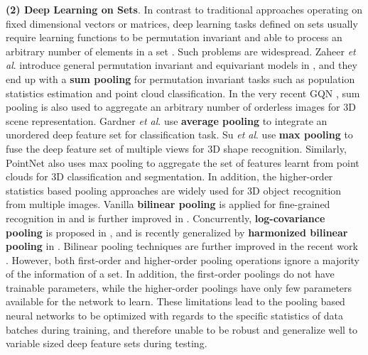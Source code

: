 \documentclass[twocolumn]{svjour3}    \pdfoutput=1
\newcommand{\etal}{\textit{et al}. }
\begin{document}
\noindent \textbf{(2) Deep Learning on Sets}. In contrast to traditional approaches operating on fixed dimensional vectors or matrices, deep learning tasks defined on sets usually require learning functions to be permutation invariant and able to process an arbitrary number of elements in a set \citep{Zaheer2017}. Such problems are widespread. Zaheer \etal introduce general permutation invariant and equivariant models in \citep{Zaheer2017}, and they end up with a \textbf{sum pooling} for permutation invariant tasks such as population statistics estimation and point cloud classification. In the very recent GQN \citep{Eslami2018}, sum pooling is also used to aggregate an arbitrary number of orderless images for 3D scene representation. Gardner \etal \citep{Gardner2017a} use \textbf{average pooling} to integrate an unordered deep feature set for classification task. Su \etal \citep{Su2015} use \textbf{max pooling} to fuse the deep feature set of multiple views for 3D shape recognition. Similarly, PointNet \citep{Qi2016} also uses max pooling to aggregate the set of features learnt from point clouds for 3D classification and segmentation. In addition, the higher-order statistics based  pooling approaches are widely used for 3D object recognition from multiple images. Vanilla \textbf{bilinear pooling} is applied for fine-grained recognition in \citep{Lin2015} and is further improved in \citep{Lin2017b}. Concurrently, \textbf{log-covariance pooling} is proposed in \citep{Ionescu2015}, and is recently generalized by \textbf{harmonized bilinear pooling} in \citep{Yu2018a}. Bilinear pooling techniques are further improved in the recent work \citep{Yu2018b,Lin2018}. However, both first-order and higher-order pooling operations ignore a majority of the information of a set. In addition, the first-order poolings do not have trainable parameters, while the higher-order poolings have only few parameters available for the network to learn. These limitations lead to the pooling based neural networks to be optimized with regards to the specific statistics of data batches during training, and therefore unable to be robust and generalize well to variable sized deep feature sets during testing. 
\end{document}
